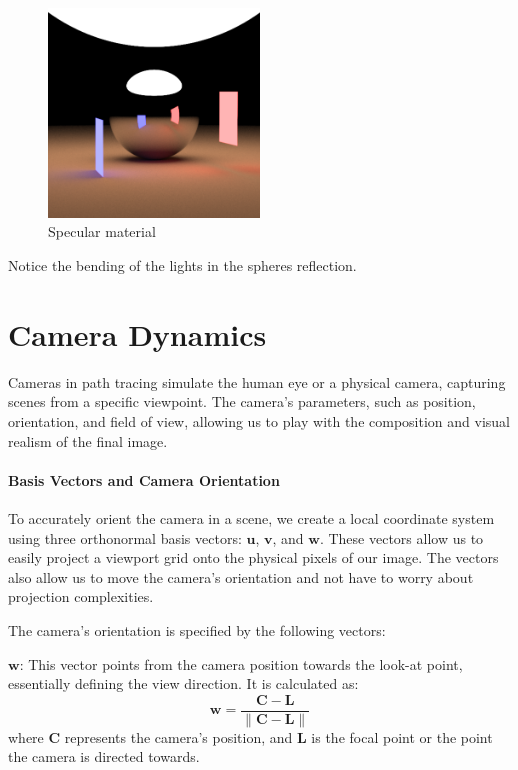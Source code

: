 \documentclass[12pt]{article}
\begin{document}
\begin{figure}[H]
    \centering
    \includegraphics[width=0.5\textwidth]{images/artsy_rep/specular_sphere.png}
    \caption{Specular material}
    \label{fig:specmat}
\end{figure}

Notice the bending of the lights in the spheres reflection.

\section{Camera Dynamics}
\label{sec:camera}

Cameras in path tracing simulate the human eye or a physical camera, capturing scenes from a specific viewpoint. The camera's parameters, such as position, orientation, and field of view, allowing us to play with the composition and visual realism of the final image.

\paragraph{Basis Vectors and Camera Orientation}
To accurately orient the camera in a scene, we create a local coordinate system using three orthonormal basis vectors: \(\mathbf{u}\), \(\mathbf{v}\), and \(\mathbf{w}\). These vectors allow us to easily project a viewport grid onto the physical pixels of our image. The vectors also allow us to move the camera's orientation and not have to worry about projection complexities.

The camera's orientation is specified by the following vectors:

\(\mathbf{w}\): This vector points from the camera position towards the look-at point, essentially defining the view direction. It is calculated as:
\[
    \mathbf{w} = \frac{\mathbf{C} - \mathbf{L}}{\|\mathbf{C} - \mathbf{L}\|}
\]
where \(\mathbf{C}\) represents the camera's position, and \(\mathbf{L}\) is the focal point or the point the camera is directed towards.
\end{document}
